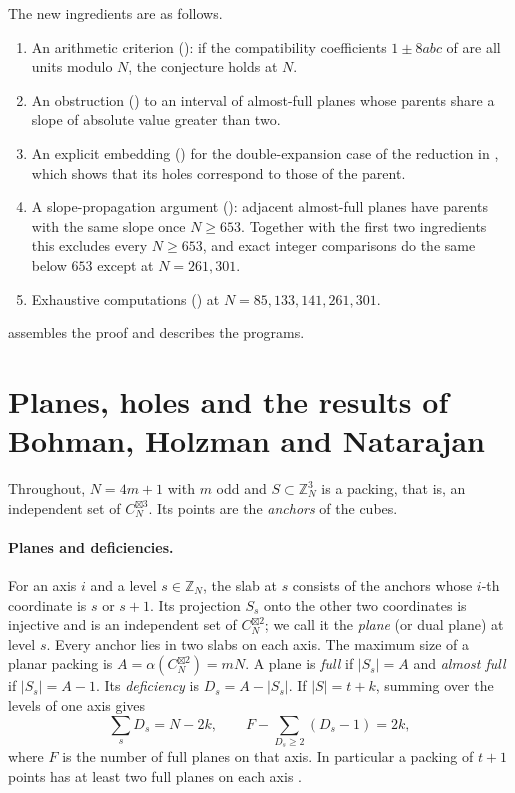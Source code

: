 \documentclass[11pt,colorlinks]{charlie}
\newcommand{\ZN}{\mathbb{Z}_N}
\newcommand{\spow}{\boxtimes}
\begin{document}
The new ingredients are as follows.
\begin{enumerate}
\item An arithmetic criterion (): if the compatibility coefficients $1\pm8abc$ of \cite[Lemma~12]{BHN} are all units modulo $N$, the conjecture holds at $N$.
\item An obstruction () to an interval of almost-full planes whose parents share a slope of absolute value greater than two.
\item An explicit embedding () for the double-expansion case of the reduction in \cite{BHNlong}, which shows that its holes correspond to those of the parent.
\item A slope-propagation argument (): adjacent almost-full planes have parents with the same slope once $N\ge653$. Together with the first two ingredients this excludes every $N\ge653$, and exact integer comparisons do the same below $653$ except at $N=261,301$.
\item Exhaustive computations () at $N=85,133,141,261,301$.
\end{enumerate}
 assembles the proof and  describes the programs.

\section{Planes, holes and the results of Bohman, Holzman and Natarajan}\label{sec:bhn}

Throughout, $N=4m+1$ with $m$ odd and $S\subset\ZN^3$ is a packing, that is, an independent set of $C_N^{\spow3}$. Its points are the \emph{anchors} of the cubes.

\paragraph{Planes and deficiencies.}
For an axis $i$ and a level $s\in\ZN$, the slab at $s$ consists of the anchors whose $i$-th coordinate is $s$ or $s+1$. Its projection $S_s$ onto the other two coordinates is injective and is an independent set of $C_N^{\spow2}$; we call it the \emph{plane} (or dual plane) at level $s$. Every anchor lies in two slabs on each axis. The maximum size of a planar packing is $A=\alpha(C_N^{\spow2})=mN$. A plane is \emph{full} if $|S_s|=A$ and \emph{almost full} if $|S_s|=A-1$. Its \emph{deficiency} is $D_s=A-|S_s|$. If $|S|=t+k$, summing over the levels of one axis gives
\begin{equation}\label{eq:deficiency}
 \sum_s D_s=N-2k,\qquad F-\sum_{D_s\ge2}(D_s-1)=2k,
\end{equation}
where $F$ is the number of full planes on that axis. In particular a packing of $t+1$ points has at least two full planes on each axis \cite[Lemmas~9 and~10]{BHN}.
\end{document}
